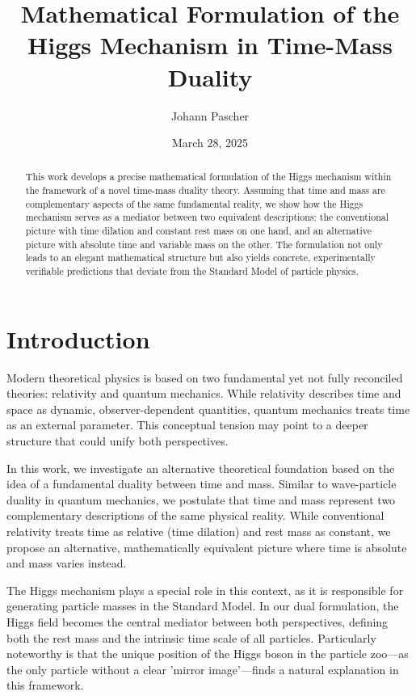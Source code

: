 \documentclass[a4paper,12pt]{article}
\title{Mathematical Formulation of the Higgs Mechanism in Time-Mass Duality}
\author{Johann Pascher}
\date{March 28, 2025}
\begin{document}
	
	\maketitle
	
	\tableofcontents
	\clearpage
	
	\begin{abstract}
		This work develops a precise mathematical formulation of the Higgs mechanism within the framework of a novel time-mass duality theory. Assuming that time and mass are complementary aspects of the same fundamental reality, we show how the Higgs mechanism serves as a mediator between two equivalent descriptions: the conventional picture with time dilation and constant rest mass on one hand, and an alternative picture with absolute time and variable mass on the other. The formulation not only leads to an elegant mathematical structure but also yields concrete, experimentally verifiable predictions that deviate from the Standard Model of particle physics.
	\end{abstract}
	
	\section*{Introduction}
	
	Modern theoretical physics is based on two fundamental yet not fully reconciled theories: relativity and quantum mechanics. While relativity describes time and space as dynamic, observer-dependent quantities, quantum mechanics treats time as an external parameter. This conceptual tension may point to a deeper structure that could unify both perspectives.
	
	In this work, we investigate an alternative theoretical foundation based on the idea of a fundamental duality between time and mass. Similar to wave-particle duality in quantum mechanics, we postulate that time and mass represent two complementary descriptions of the same physical reality. While conventional relativity treats time as relative (time dilation) and rest mass as constant, we propose an alternative, mathematically equivalent picture where time is absolute and mass varies instead.
	
	The Higgs mechanism plays a special role in this context, as it is responsible for generating particle masses in the Standard Model. In our dual formulation, the Higgs field becomes the central mediator between both perspectives, defining both the rest mass and the intrinsic time scale of all particles. Particularly noteworthy is that the unique position of the Higgs boson in the particle zoo—as the only particle without a clear 'mirror image'—finds a natural explanation in this framework.
	
\end{document}
